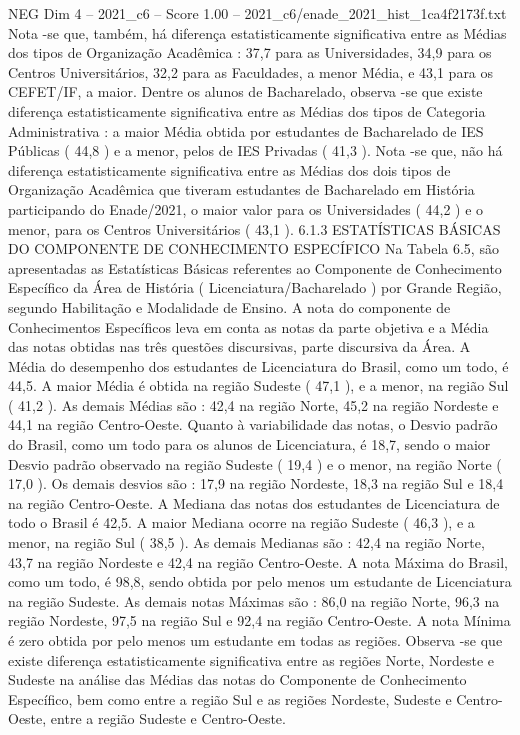 \begin{textsample}{NEG Dim 4 – 2021\_c6 – Score 1.00 – 2021\_c6/enade\_2021\_hist\_1ca4f2173f.txt}
Nota -se que, também, há diferença estatisticamente significativa entre as Médias dos tipos de Organização Acadêmica : 37,7 para as Universidades, 34,9 para os Centros Universitários, 32,2 para as Faculdades, a menor Média, e 43,1 para os CEFET/IF, a maior.
Dentre os alunos de Bacharelado, observa -se que existe diferença estatisticamente significativa entre as Médias dos tipos de Categoria Administrativa : a maior Média obtida por estudantes de Bacharelado de IES Públicas ( 44,8 ) e a menor, pelos de IES Privadas ( 41,3 ).
Nota -se que, não há diferença estatisticamente significativa entre as Médias dos dois tipos de Organização Acadêmica que tiveram estudantes de Bacharelado em História participando do Enade/2021, o maior valor para os Universidades ( 44,2 ) e o menor, para os Centros Universitários ( 43,1 ). 6.1.3 ESTATÍSTICAS BÁSICAS DO COMPONENTE DE CONHECIMENTO ESPECÍFICO Na Tabela 6.5, são apresentadas as Estatísticas Básicas referentes ao Componente de Conhecimento Específico da Área de História ( Licenciatura/Bacharelado ) por Grande Região, segundo Habilitação e Modalidade de Ensino.
A nota do componente de Conhecimentos Específicos leva em conta as notas da parte objetiva e a Média das notas obtidas nas três questões discursivas, parte discursiva da Área.
A Média do desempenho dos estudantes de Licenciatura do Brasil, como um todo, é 44,5.
A maior Média é obtida na região Sudeste ( 47,1 ), e a menor, na região Sul ( 41,2 ).
As demais Médias são : 42,4 na região Norte, 45,2 na região Nordeste e 44,1 na região Centro-Oeste.
Quanto à variabilidade das notas, o Desvio padrão do Brasil, como um todo para os alunos de Licenciatura, é 18,7, sendo o maior Desvio padrão observado na região Sudeste ( 19,4 ) e o menor, na região Norte ( 17,0 ).
Os demais desvios são : 17,9 na região Nordeste, 18,3 na região Sul e 18,4 na região Centro-Oeste.
A Mediana das notas dos estudantes de Licenciatura de todo o Brasil é 42,5.
A maior Mediana ocorre na região Sudeste ( 46,3 ), e a menor, na região Sul ( 38,5 ).
As demais Medianas são : 42,4 na região Norte, 43,7 na região Nordeste e 42,4 na região Centro-Oeste.
A nota Máxima do Brasil, como um todo, é 98,8, sendo obtida por pelo menos um estudante de Licenciatura na região Sudeste.
As demais notas Máximas são : 86,0 na região Norte, 96,3 na região Nordeste, 97,5 na região Sul e 92,4 na região Centro-Oeste.
A nota Mínima é zero obtida por pelo menos um estudante em todas as regiões.
Observa -se que existe diferença estatisticamente significativa entre as regiões Norte, Nordeste e Sudeste na análise das Médias das notas do Componente de Conhecimento Específico, bem como entre a região Sul e as regiões Nordeste, Sudeste e Centro-Oeste, entre a região Sudeste e Centro-Oeste.

\end{textsample}
